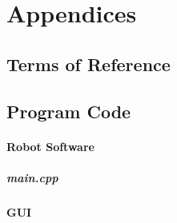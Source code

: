 \part{Appendices}
	\begin{appendices}
	\chapter{Terms of Reference}
	
	\chapter{Program Code}
		\subsection{Robot Software}
			\subsubsection{main.cpp}
			
		\subsection{GUI}

\end{appendices}

